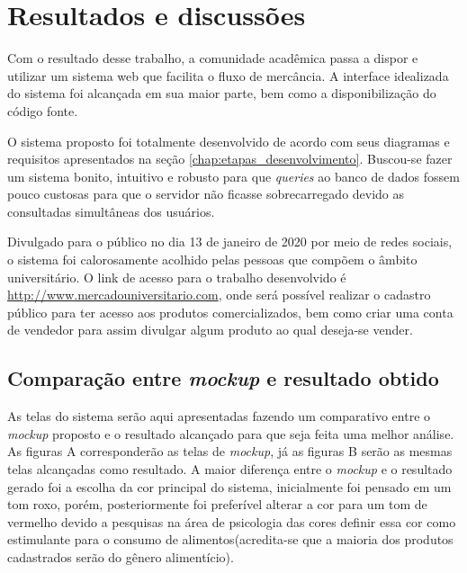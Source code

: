 \chapter{Resultados e discussões}
\label{chap:resultados}

Com o resultado desse trabalho, a comunidade acadêmica passa a dispor e utilizar um sistema web que facilita o fluxo de mercância. A interface idealizada do sistema foi alcançada em sua maior parte, bem como a disponibilização do código fonte.

O sistema proposto foi totalmente desenvolvido de acordo com seus diagramas e requisitos apresentados na seção \ref{chap:etapas_desenvolvimento}. Buscou-se fazer um sistema bonito, intuitivo e robusto para que \textit{queries} ao banco de dados fossem pouco custosas para que o servidor não ficasse sobrecarregado devido as consultadas simultâneas dos usuários.

Divulgado para o público no dia 13 de janeiro de 2020 por meio de redes sociais, o sistema foi calorosamente acolhido pelas pessoas que compõem o âmbito universitário. O link de acesso para o trabalho desenvolvido é \url{http://www.mercadouniversitario.com}, onde será possível realizar o cadastro público para ter acesso aos produtos comercializados, bem como criar uma conta de vendedor para assim divulgar algum produto ao qual deseja-se vender.

\section{Comparação entre \textit{mockup} e resultado obtido}

As telas do sistema serão aqui apresentadas fazendo um comparativo entre o \textit{mockup} proposto e o resultado alcançado para que seja feita uma melhor análise. As figuras A corresponderão as telas de \textit{mockup}, já as figuras B serão as mesmas telas alcançadas como resultado. A maior diferença entre o \textit{mockup} e o resultado gerado foi a escolha da cor principal do sistema, inicialmente foi pensado em um tom roxo, porém, posteriormente foi preferível alterar a cor para um tom de vermelho devido a pesquisas na área de psicologia das cores definir essa cor como estimulante para o consumo de alimentos(acredita-se que a maioria dos produtos cadastrados serão do gênero alimentício).

